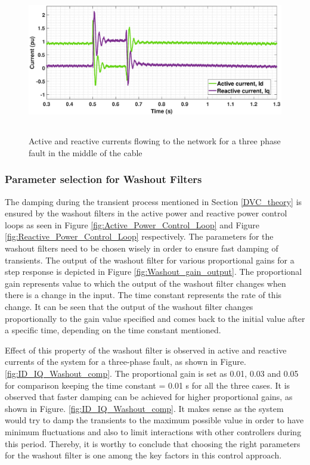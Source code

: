 \begin{figure}[H]
\hspace*{-0.1cm}
    \includegraphics[height = 6.5cm,width = 15.5cm]{Diagrams/Chapter_3/ID_IQ_Final_3.eps}
    \caption{Active and reactive currents flowing to the network for a three phase fault in the middle of the cable}
    \label{fig:ID_IQ_fullACSource}
\end{figure}


\subsubsection{Parameter selection for Washout Filters}\label{para_selection_washout}
The damping during the transient process mentioned in Section \ref{DVC_theory} is ensured by the washout filters in the active power and reactive power control loops as seen in Figure \ref{fig:Active_Power_Control_Loop} and Figure \ref{fig:Reactive_Power_Control_Loop} respectively. The parameters for the washout filters need to be chosen wisely in order to ensure fast damping of transients. The output of the washout filter for various proportional gains for a step response is depicted in Figure \ref{fig:Washout_gain_output}. The proportional gain represents value to which the output of the washout filter changes when there is a change in the input. The time constant represents the rate of this change. It can be seen that the output of the washout filter changes proportionally to the gain value specified and comes back to the initial value after a specific time, depending on the time constant mentioned.


Effect of this property of the washout filter is observed in active and reactive currents of the system for a three-phase fault, as shown in Figure. \ref{fig:ID_IQ_Washout_comp}. The proportional gain is set as 0.01, 0.03 and 0.05 for comparison keeping the time constant = 0.01 s for all the three cases. It is observed that faster damping can be achieved for higher proportional gains, as shown in Figure. \ref{fig:ID_IQ_Washout_comp}. It makes sense as the system would try to damp the transients to the maximum possible value in order to have minimum fluctuations and also to limit interactions with other controllers during this period. Thereby, it is worthy to conclude that choosing the right parameters for the washout filter is one among the key factors in this control approach.

